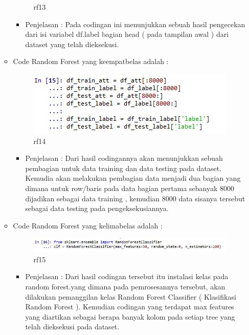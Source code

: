 \begin{enumerate}
\begin{itemize}
\begin{figure}[ht]
\caption{rf13}
\label{contoh}
\end{figure}
\par
\begin{itemize}
\item Penjelasan : Pada codingan ini menunjukkan sebuah hasil pengecekan dari isi variabel df.label bagian head ( pada tampilan awal ) dari dataset yang telah dieksekusi.
\par
\par
\end{itemize}
\item Code Random Forest yang keempatbelas adalah :
\par
\begin{figure}[ht]
\centering
\includegraphics[scale=0.4]{figures/rfcahya14.jpg}
\caption{rf14}
\label{contoh}
\end{figure}
\par
\begin{itemize}
\item Penjelasan : Dari hasil codingannya akan menunjukkan sebuah pembagian untuk data training dan data testing pada dataset. Kemudia akan melakukan pembagian data menjadi dua bagian yang dimana untuk row/baris pada data bagian pertama sebanyak 8000 dijadikan sebagai data training , kemudian 8000 data sisanya tersebut sebagai data testing pada pengeksekusiannya.
\par
\par
\end{itemize}
\item Code Random Forest yang kelimabelas adalah :
\par
\begin{figure}[ht]
\centering
\includegraphics[scale=0.4]{figures/rfcahya15.jpg}
\caption{rf15}
\label{contoh}
\end{figure}
\par
\begin{itemize}
\item Penjelasan : Dari hasil codingan tersebut itu instalasi kelas pada random forest.yang dimana pada pemrosesannya tersebut, akan dilakukan pemanggilan kelas Random Forest Classifier ( Klasifikasi Random Forest ). Kemudian codingan yang terdapat max features yang diartikan sebagai berapa banyak kolom pada setiap tree yang telah dieksekusi pada dataset. 

\end{itemize}
\end{itemize}
\end{enumerate}
